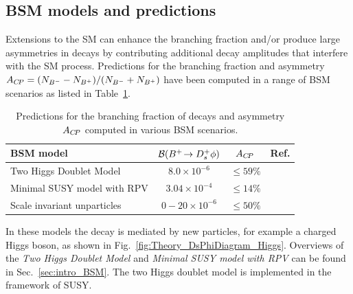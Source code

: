 


\subsection{BSM models and predictions}
Extensions to the SM can enhance the branching fraction and/or produce large \CP asymmetries in \decay{\Bp}{\Dsp\phiz} decays by contributing additional decay amplitudes that interfere with the SM process.
Predictions for the branching fraction and \CP asymmetry $A_{{C\!P}} = (N_{{{{B}^-}}}-N_{{{{B}^+}}})/(N_{{{{B}^-}}}+N_{{{{B}^+}}})$ have been computed in a range of BSM scenarios as listed in Table~\ref{tab:theory_BSM_br}. 
\begin{table}[h]
    \centering
    \begin{tabular}{ l c c c }
        \hline
        BSM model                                        & ${\mathcal{B}}({{{B}^+}}\!\rightarrow {\ensuremath{{D}^+_{s}}}\phi)$      & $A_{{C\!P}}$&  Ref.\\
        \hline
        Two Higgs Doublet Model                          & $8.0\times10^{-6}$    & $\leq59\%$ & ~\cite{Mohanta:2002wf}        \\
        Minimal SUSY model with RPV                      & $3.04\times10^{-4}$   & $\leq14\%$ & ~\cite{Mohanta:2002wf}     \\
        Scale invariant unparticles~\cite{GEORGI2007275} & $0-20\times10^{-6}$   & $\leq50\%$ & ~\cite{Mohanta:2007uu}     \\
        \hline 
    \end{tabular}
    \caption{Predictions for the branching fraction of \decay{\Bp}{\Dsp\phiz} decays and \CP asymmetry $A_{{C\!P}}$ computed in various BSM scenarios.}
    \label{tab:theory_BSM_br}
\end{table}
In these models the decay is mediated by new particles, for example a charged Higgs boson, as shown in Fig.~\ref{fig:Theory_DsPhiDiagram_Higgs}. Overviews of the \emph{Two Higgs Doublet Model} and \emph{Minimal SUSY model with RPV} can be found in Sec.~\ref{sec:intro_BSM}.  The two Higgs doublet model is implemented in the framework of SUSY.

